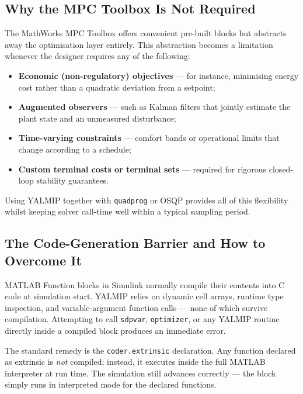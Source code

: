 \subsection{Why the MPC Toolbox Is Not Required}
\label{subsec:no_toolbox}

The MathWorks MPC Toolbox offers convenient pre-built blocks but
abstracts away the optimisation layer entirely.  This abstraction
becomes a limitation whenever the designer requires any of the
following:

\begin{itemize}[noitemsep]
	\item \textbf{Economic (non-regulatory) objectives} — for instance,
	minimising energy cost rather than a quadratic deviation from a
	setpoint;
	\item \textbf{Augmented observers} — such as Kalman filters that
	jointly estimate the plant state and an unmeasured disturbance;
	\item \textbf{Time-varying constraints} — comfort bands or
	operational limits that change according to a schedule;
	\item \textbf{Custom terminal costs or terminal sets} — required for
	rigorous closed-loop stability guarantees.
\end{itemize}

Using YALMIP together with \texttt{quadprog} or OSQP provides all of
this flexibility whilst keeping solver call-time well within a typical
sampling period.

\subsection{The Code-Generation Barrier and How to Overcome It}
\label{subsec:extrinsic}

MATLAB Function blocks in Simulink normally compile their contents into
C code at simulation start.  YALMIP relies on dynamic cell arrays,
runtime type inspection, and variable-argument function calls — none of
which survive compilation.  Attempting to call \texttt{sdpvar},
\texttt{optimizer}, or any YALMIP routine directly inside a compiled
block produces an immediate error.

The standard remedy is the \texttt{coder.extrinsic} declaration.  Any
function declared as extrinsic is \emph{not} compiled; instead, it
executes inside the full MATLAB interpreter at run time.  The
simulation still advances correctly — the block simply runs in
interpreted mode for the declared functions.

